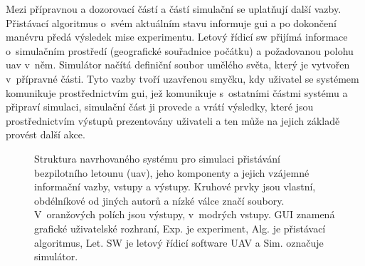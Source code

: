     Mezi přípravnou a dozorovací částí a částí simulační se uplatňují další vazby. Přistávací algoritmus o~svém aktuálním stavu informuje \acrshort{gui} a po dokončení manévru předá výsledek mise experimentu. Letový řídicí \acrshort{sw} přijímá informace o~simulačním prostředí (geografické souřadnice počátku) a požadovanou polohu \acrshort{uav} v~něm. Simulátor načítá definiční soubor umělého světa, který je vytvořen v~přípravné části. Tyto vazby tvoří uzavřenou smyčku, kdy uživatel se systémem komunikuje prostřednictvím \acrshort{gui}, jež komunikuje s~ostatními částmi systému a připraví simulaci, simulační část ji provede a vrátí výsledky, které jsou prostřednictvím výstupů prezentovány uživateli a ten může na jejich základě provést další akce.
    \begin{figure}
      \caption[Struktura navrhovaného systému]{Struktura navrhovaného systému pro simulaci přistávání bezpilotního letounu (\acrshort{uav}), jeho komponenty a jejich vzájemné informační vazby, vstupy a výstupy. Kruhové prvky jsou vlastní, obdélníkové od jiných autorů a nízké válce značí soubory. V~oranžových polích jsou výstupy, v~modrých vstupy. GUI znamená grafické uživatelské rozhraní, Exp. je experiment, Alg. je přistávací algoritmus, Let. SW je letový řídicí software UAV a Sim. označuje simulátor.}
      \label{fig:sysStruktura}
    \end{figure}